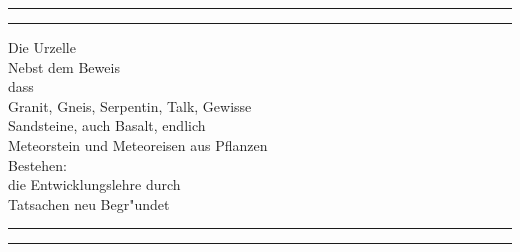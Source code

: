 \documentclass[a4paper, 11pt, oneside, german]{article}
\begin{document}
\frakfamily
\renewcommand{\contentsname}{
\frakfamily{Inhaltsverzeichnis}
}
\renewcommand{\listfigurename}{
\frakfamily{Abbildungsverzeichnis}
}
\let\origcftsecfont\cft
\let\origcftsecpagefont\cftsecpagefont
\let\origcftsecafterpnum\cftsecafterpnum
\renewcommand{\cftsecpagefont}{\frakfamily{\origcftsecpagefont}}
\renewcommand{\cftsecafterpnum}{\frakfamily{\origcftsecafterpnum}}
\let\origcftsubsecpagefont\cftsubsecpagefont
\let\origcftsubsecafterpnum\cftsubsecafterpnum
\renewcommand{\cftsubsecpagefont}{\frakfamily{\origcftsubsecpagefont}}
\renewcommand{\cftsubsecafterpnum}{\frakfamily{\origcftsubsecafterpnum}}
\begin{titlepage} %
	\centering %
	\scshape %

	
	\rule{\textwidth}{1.6pt}\vspace*{-\baselineskip}\vspace*{2pt} %
	\rule{\textwidth}{0.4pt} %
	
	\vspace{0.75\baselineskip} %
	
	{\Huge Die Urzelle\\}
	\vspace{0.75\baselineskip}
	{\Large Nebst dem Beweis\\ dass\\ Granit, Gneis, Serpentin, Talk, Gewisse\\ Sandsteine, auch Basalt, endlich\\ Meteorstein und Meteoreisen aus Pflanzen\\ Bestehen:\\ die Entwicklungslehre durch\\ Tatsachen neu Begr"undet\\} %
	
	\vspace{0.75\baselineskip} %
	
	\rule{\textwidth}{0.4pt}\vspace*{-\baselineskip}\vspace{3.2pt} %
	\rule{\textwidth}{1.6pt} %
	
	\vspace{1\baselineskip} %
	

\end{titlepage}
\end{document}
